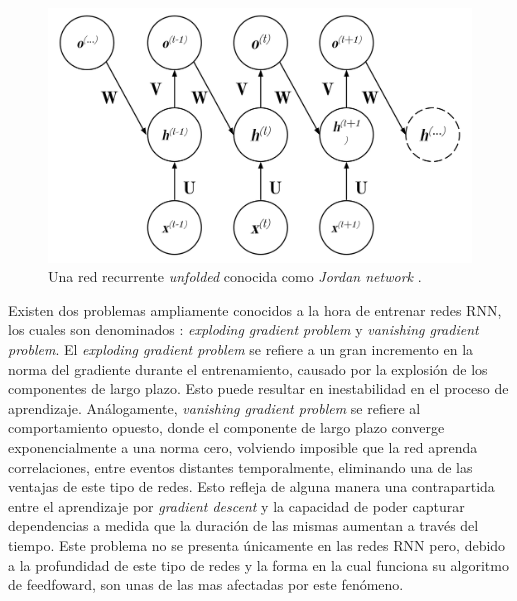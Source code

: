 \documentclass[spanish]{article}
\theoremstyle{definition}
\theoremstyle{remark}
\numberwithin{equation}{section}
\numberwithin{equation}{section} %
\begin{document}
\begin{figure}[H]
 \centering
 \includegraphics[width=13cm]{img/RNN_Schema_Multiple_Output_Different_Recurrency.png}
\caption[Diagrama RNN  \textit{Jordan network}]{\footnotesize{ Una red recurrente \cite{goodfellow2016deep} \textit{unfolded} conocida como \textit{Jordan network} \cite{jordan1997serial}.  }}
\label{fig:RNN_multiple_outputs_differente_recurrency}
\end{figure}
Existen dos problemas ampliamente conocidos a la hora de entrenar redes RNN, los cuales son denominados : \textit{exploding gradient problem} \cite{hochreiter1991untersuchungen,bengio1993problem,hochreiter2001gradient} y
\textit{vanishing gradient problem}. El \textit{exploding gradient problem} se refiere a un gran incremento en la norma del gradiente durante el entrenamiento, causado por la explosión de los componentes de largo plazo. Esto puede resultar en inestabilidad en el proceso de aprendizaje. Análogamente, \textit{vanishing gradient problem} se refiere al comportamiento opuesto, donde el componente de largo plazo converge exponencialmente a una norma cero, volviendo imposible que la red aprenda correlaciones, entre eventos distantes temporalmente, eliminando una de las ventajas de este tipo de redes. Esto refleja de alguna manera una contrapartida entre el aprendizaje por \textit{gradient descent} y la capacidad de poder capturar dependencias a medida que la duración de las mismas aumentan a través del tiempo. Este problema no se presenta únicamente en las redes RNN pero, debido a la profundidad de este tipo de redes y la forma en la cual funciona su algoritmo de feedfoward, son unas de las mas afectadas por este fenómeno. 
\par
\end{document}
